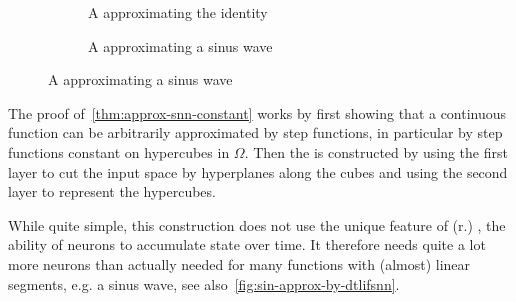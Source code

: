 \begin{figure}[h!]
  \begin{subfigure}[t]{0.45\textwidth}
    \centering
    \caption{A \dtlifsnn approximating the identity}
    \label{id:sin-approx-by-dtlifsnn}
  \end{subfigure}
  \hfill
  \begin{subfigure}[t]{0.55\textwidth}
    \centering
    \caption{A \dtlifsnn approximating a sinus wave}
    \label{fig:sin-approx-by-dtlifsnn}
  \end{subfigure}
\end{figure}

The proof of~\autoref{thm:approx-snn-constant} works by first showing that a continuous function can be arbitrarily approximated by step functions, in particular by step functions constant on hypercubes in \(Ω\).
Then the \dtlifsnn is constructed by using the first layer to cut the input space by hyperplanes along the cubes and using the second layer to represent the hypercubes.

While quite simple, this construction does not use the unique feature of (r.) \dtlifsnn, the ability of neurons to accumulate state over time. It therefore needs quite a lot more neurons than actually needed for many functions with (almost) linear segments, e.g. a sinus wave, see also~\autoref{fig:sin-approx-by-dtlifsnn}.

